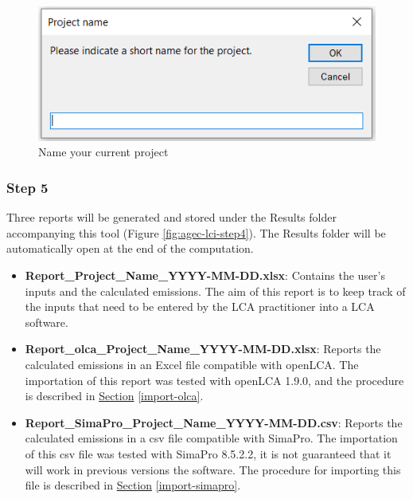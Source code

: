 \documentclass[openany]{book}
\begin{document}
\begin{figure}[ht]

{\centering \includegraphics[width=6.76in]{Figures/agec_lci_step3} 

}

\caption{Name your current project}\label{fig:agec-lci-step3}
\end{figure}

\hypertarget{step-5}{%
\subsubsection*{Step 5}\label{step-5}}

Three reports will be generated and stored under the Results folder accompanying this tool (Figure \ref{fig:agec-lci-step4}). The Results folder will be automatically open at the end of the computation.

\begin{itemize}
\item
  \textbf{Report\_Project\_Name\_YYYY-MM-DD.xlsx}: Contains the user's inputs and the calculated emissions. The aim of this report is to keep track of the inputs that need to be entered by the LCA practitioner into a LCA software.
\item
  \textbf{Report\_olca\_Project\_Name\_YYYY-MM-DD.xlsx}: Reports the calculated emissions in an Excel file compatible with openLCA. The importation of this report was tested with openLCA 1.9.0, and the procedure is described in \protect\hyperlink{import-olca}{Section} \ref{import-olca}.
\item
  \textbf{Report\_SimaPro\_Project\_Name\_YYYY-MM-DD.csv}: Reports the calculated emissions in a csv file compatible with SimaPro. The importation of this csv file was tested with SimaPro 8.5.2.2, it is not guaranteed that it will work in previous versions the software. The procedure for importing this file is described in \protect\hyperlink{import-simapro}{Section} \ref{import-simapro}.
\end{itemize}
\end{document}

